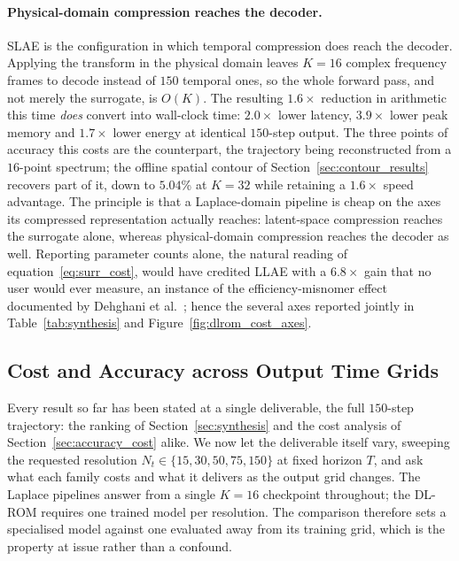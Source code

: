 ﻿\documentclass[a4paper,12pt]{article}
\theoremstyle{definition}
\theoremstyle{remark}
\begin{document}
\paragraph{Physical-domain compression reaches the decoder.}
SLAE is the configuration in which temporal compression does reach the decoder. Applying the transform in the physical domain leaves $K = 16$ complex frequency frames to decode instead of $150$ temporal ones, so the whole forward pass, and not merely the surrogate, is $O(K)$. The resulting $1.6\times$ reduction in arithmetic this time \emph{does} convert into wall-clock time: $2.0\times$ lower latency, $3.9\times$ lower peak memory and $1.7\times$ lower energy at identical $150$-step output. The three points of accuracy this costs are the counterpart, the trajectory being reconstructed from a $16$-point spectrum; the offline spatial contour of Section~\ref{sec:contour_results} recovers part of it, down to $5.04$\% at $K = 32$ while retaining a $1.6\times$ speed advantage. The principle is that a Laplace-domain pipeline is cheap on the axes its compressed representation actually reaches: latent-space compression reaches the surrogate alone, whereas physical-domain compression reaches the decoder as well. Reporting parameter counts alone, the natural reading of equation~\eqref{eq:surr_cost}, would have credited LLAE with a $6.8\times$ gain that no user would ever measure, an instance of the efficiency-misnomer effect documented by Dehghani et al.~\cite{dehghani2022efficiency}; hence the several axes reported jointly in Table~\ref{tab:synthesis} and Figure~\ref{fig:dlrom_cost_axes}.

\subsection{Cost and Accuracy across Output Time Grids}
\label{sec:resolution_accuracy}

Every result so far has been stated at a single deliverable, the full $150$-step trajectory: the ranking of Section~\ref{sec:synthesis} and the cost analysis of Section~\ref{sec:accuracy_cost} alike. We now let the deliverable itself vary, sweeping the requested resolution $N_t \in \{15, 30, 50, 75, 150\}$ at fixed horizon $T$, and ask what each family costs and what it delivers as the output grid changes. The Laplace pipelines answer from a single $K = 16$ checkpoint throughout; the DL-ROM requires one trained model per resolution. The comparison therefore sets a specialised model against one evaluated away from its training grid, which is the property at issue rather than a confound.
\end{document}
